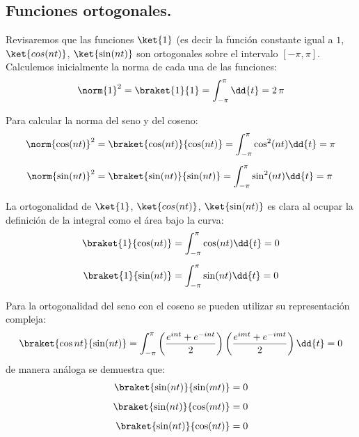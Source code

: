 \subsection{Funciones ortogonales.}

Revisaremos que las funciones $\ket{1}$ (es decir la función constante igual a $1$, $\ket{cos (nt)}$, $\ket{\sin (nt)}$ son ortogonales sobre el intervalo $[- \pi, \pi]$. Calculemos inicialmente la norma de cada una de las funciones:
\begin{align*}
\norm{1}^{2} = \braket{1}{1} = \int_{-\pi}^{\pi} \dd{t} = 2 \,\pi
\end{align*}

Para calcular la norma del seno y del coseno:
\begin{align*}
\norm{\cos (nt)}^{2} &= \braket{\cos(nt)}{\cos(nt)} = \int_{-\pi}^{\pi} \cos^{2} (nt) \dd{t} = \pi %
\\[0.5em]
\norm{\sin (nt)}^{2} &= \braket{\sin(nt)}{\sin(nt)} = \int_{-\pi}^{\pi} \sin^{2} (nt) \dd{t} = \pi %
\end{align*}

La ortogonalidad de $\ket{1}$, $\ket{cos (nt)}$, $\ket{\sin (nt)}$ es clara al ocupar la definición de la integral como el área bajo la curva:
\begin{align*}
\braket{1}{\cos (nt)} &= \int_{-\pi}^{\pi} \cos (nt) \dd{t} = 0 %
\\[0.5em]
\braket{1}{\sin (nt)} &= \int_{-\pi}^{\pi} \sin (nt) \dd{t} = 0 %
\end{align*}

Para la ortogonalidad del seno con el coseno se pueden utilizar su representación compleja:
\begin{align*}
\braket{\cos{nt}}{\sin(nt)} = \int_{-\pi}^{\pi} \left( \dfrac{e^{int} + e^{-int}}{2} \right) \left( \dfrac{e^{imt} + e^{-imt}}{2} \right) \dd{t} = 0
\end{align*}
de manera análoga se demuestra que:
\begin{align*}
\braket{\sin(nt)}{\sin(mt)} &= 0 \\[0.5em]
\braket{\sin(nt)}{\cos(mt)} &= 0 \\[0.5em]
\braket{\sin(nt)}{\cos(nt)} &= 0
\end{align*}

